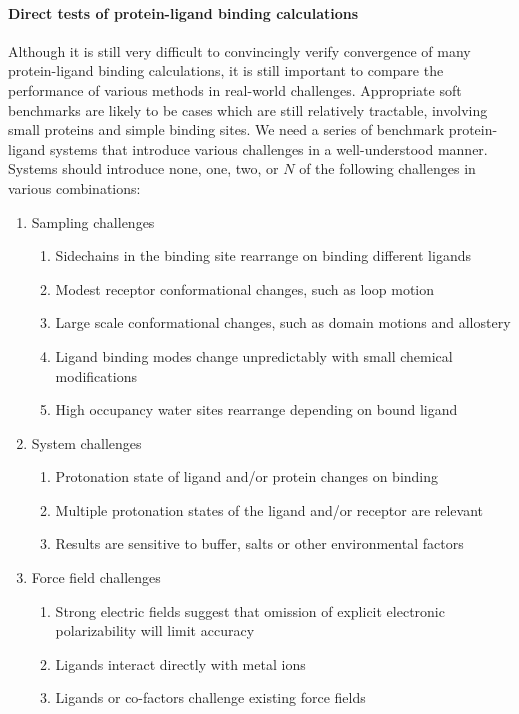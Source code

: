 \documentclass[aps,pre,twocolumn,nofootinbib,superscriptaddress,10pt, final,tightenlines]{revtex4-1}
\begin{document}
\paragraph{Direct tests of protein-ligand binding calculations}
Although it is still very difficult to convincingly verify convergence of many protein-ligand binding calculations, it is still important to compare the performance of various methods in real-world challenges. 
Appropriate soft benchmarks are likely to be cases which are still relatively tractable, involving small proteins and simple binding sites.
We need a series of benchmark protein-ligand systems that introduce various challenges in a well-understood manner. 
Systems should introduce none, one, two, or $N$ of the following challenges in various combinations:
\begin{enumerate}
\item Sampling challenges
  \begin{enumerate}
  \item Sidechains in the binding site rearrange on binding different ligands
  \item Modest receptor conformational changes, such as loop motion
  \item Large scale conformational changes, such as domain motions and allostery
  \item Ligand binding modes change unpredictably with small chemical modifications
  \item High occupancy water sites rearrange depending on bound ligand
  \end{enumerate}
\item System challenges
  \begin{enumerate}
  \item Protonation state of ligand and/or protein changes on binding
  \item Multiple protonation states of the ligand and/or receptor are relevant
  \item Results are sensitive to buffer, salts or other environmental factors
\end{enumerate}
\item Force field challenges
  \begin{enumerate}
  \item Strong electric fields suggest that omission of explicit electronic polarizability will limit accuracy
  \item Ligands interact directly with metal ions
  \item Ligands or co-factors challenge existing force fields
\end{enumerate}
\end{enumerate}
\end{document}
